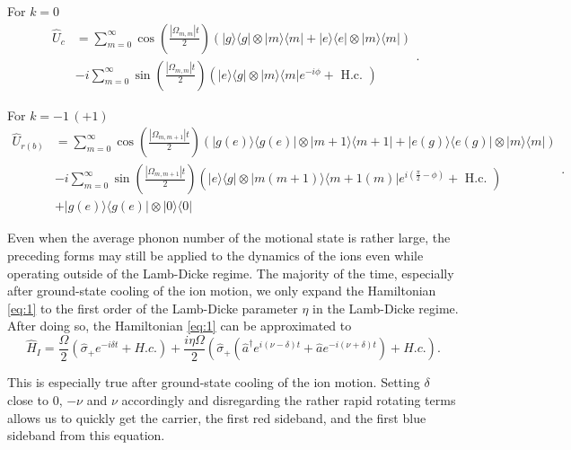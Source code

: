 For $k=0$
\begin{equation}
    \begin{aligned}
        \hat{U}_c & =\sum_{m=0}^{\infty} \cos \left(\frac{\left|\Omega_{m, m}\right| t}{2}\right)(|g\rangle\langle g|\otimes| m\rangle\langle m|+| e\rangle\langle e|\otimes| m\rangle\langle m|) \\
                  & -i \sum_{m=0}^{\infty} \sin \left(\frac{\left|\Omega_{m, m}\right| t}{2}\right)\left(|e\rangle\langle g|\otimes| m\rangle\langle m| e^{-i \phi}+\text { H.c. }\right)
    \end{aligned}
    .
\end{equation}

For $k=-1\, (+1)$
\begin{equation}
    \begin{aligned}
        \hat{U}_{r(b)} & =\sum_{m=0}^{\infty} \cos \left(\frac{\left|\Omega_{m, m+1}\right| t}{2}\right)(|g(e)\rangle\langle g(e)|\otimes| m+1\rangle\langle m+1|+| e(g)\rangle\langle e(g)|\otimes| m\rangle\langle m|)            \\
                       & -i \sum_{m=0}^{\infty} \sin \left(\frac{\left|\Omega_{m, m+1}\right| t}{2}\right)\left(|e\rangle\langle g|\otimes| m(m+1)\rangle\langle m+1(m)| e^{i\left(\frac{\pi}{2}-\phi\right)}+\text { H.c. }\right)
        \\
                       & +|g(e)\rangle\langle g(e)|\otimes| 0\rangle\langle 0|
    \end{aligned}
    .
\end{equation}

Even when the average phonon number of the motional state is rather large, the preceding forms may still be applied to the dynamics of the ions even while operating outside of the Lamb-Dicke regime. The majority of the time, especially after ground-state cooling of the ion motion, we only expand the Hamiltonian \eqref{eq:1} to the first order of the Lamb-Dicke parameter $\eta$ in the Lamb-Dicke regime. After doing so, the Hamiltonian \eqref{eq:1} can be approximated to
\begin{equation}
    \label{10}
    \hat{H}_I=\frac{\Omega}{2} (\hat{\sigma}_+ e^{-i\delta t}+H.c.) +\frac{i\eta\Omega}{2}\left(\hat{\sigma}_+ (\hat{a}^\dagger e^{i(\nu-\delta) t} + \hat{a}e^{-i(\nu+\delta) t})+H.c.\right).
\end{equation}

This is especially true after ground-state cooling of the ion motion. Setting $\delta$ close to $0$, $-\nu$ and $\nu$ accordingly and disregarding the rather rapid rotating terms allows us to quickly get the carrier, the first red sideband, and the first blue sideband from this equation.

